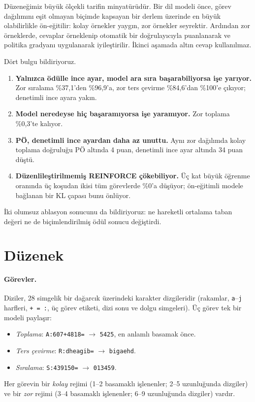 \documentclass[10pt,twocolumn]{article}
\begin{document}
Düzeneğimiz büyük ölçekli tarifin minyatürüdür. Bir dil modeli önce, görev dağılımını eşit olmayan
biçimde kapsayan bir derlem üzerinde en büyük olabilirlikle ön-eğitilir: kolay örnekler yaygın,
zor örnekler seyrektir. Ardından zor örneklerde, cevaplar örneklenip otomatik bir doğrulayıcıyla
puanlanarak ve politika gradyanı uygulanarak iyileştirilir. İkinci aşamada altın cevap kullanılmaz.

Dört bulgu bildiriyoruz.
\begin{enumerate}
\itemsep0pt
\item \textbf{Yalnızca ödülle ince ayar, model ara sıra başarabiliyorsa işe yarıyor.} Zor sıralama
\%37,1'den \%96,9'a, zor ters çevirme \%84,6'dan \%100'e çıkıyor; denetimli ince ayara yakın.
\item \textbf{Model neredeyse hiç başaramıyorsa işe yaramıyor.} Zor toplama \%0,3'te kalıyor.
\item \textbf{PÖ, denetimli ince ayardan daha az unuttu.} Aynı zor dağılımda kolay toplama doğruluğu
PÖ altında 4 puan, denetimli ince ayar altında 34 puan düştü.
\item \textbf{Düzenlileştirilmemiş REINFORCE çökebiliyor.} Üç kat büyük öğrenme oranında üç koşudan
ikisi tüm görevlerde \%0'a düşüyor; ön-eğitimli modele bağlanan bir KL çapası bunu önlüyor.
\end{enumerate}
İki olumsuz ablasyon sonucunu da bildiriyoruz: ne hareketli ortalama taban değeri ne de
biçimlendirilmiş ödül sonucu değiştirdi.

\section{Düzenek}
\paragraph{Görevler.} Diziler, 28 simgelik bir dağarcık üzerindeki karakter dizgileridir (rakamlar,
\texttt{a}--\texttt{j} harfleri, \texttt{+ = :}, üç görev etiketi, dizi sonu ve dolgu simgeleri).
Üç görev tek bir modeli paylaşır:
\begin{itemize}
\itemsep0pt
\item \emph{Toplama}: \texttt{A:607+4818=} $\to$ \texttt{5425}, en anlamlı basamak önce.
\item \emph{Ters çevirme}: \texttt{R:dheagib=} $\to$ \texttt{bigaehd}.
\item \emph{Sıralama}: \texttt{S:439150=} $\to$ \texttt{013459}.
\end{itemize}
Her görevin bir \emph{kolay} rejimi (1--2 basamaklı işlenenler; 2--5 uzunluğunda dizgiler) ve bir
\emph{zor} rejimi (3--4 basamaklı işlenenler; 6--9 uzunluğunda dizgiler) vardır.
\end{document}
